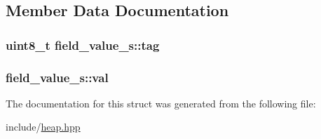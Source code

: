 \subsection{Member Data Documentation}
\hypertarget{structfield__value__s_a4fe2c4d897f539e3b0f3d50ecc5083c1}{
\subsubsection[{tag}]{\setlength{\rightskip}{0pt plus 5cm}uint8\+\_\+t field\+\_\+value\+\_\+s\+::tag}}\label{structfield__value__s_a4fe2c4d897f539e3b0f3d50ecc5083c1}
\hypertarget{structfield__value__s_ac2dfcee3f37fc6387bbf5b7a9a5eeb6b}{
\subsubsection[{val}]{ field\+\_\+value\+\_\+s\+::val}}\label{structfield__value__s_ac2dfcee3f37fc6387bbf5b7a9a5eeb6b}


The documentation for this struct was generated from the following file\+:\begin{DoxyCompactItemize}
\item 
include/\hyperlink{heap_8hpp}{heap.\+hpp}\end{DoxyCompactItemize}
